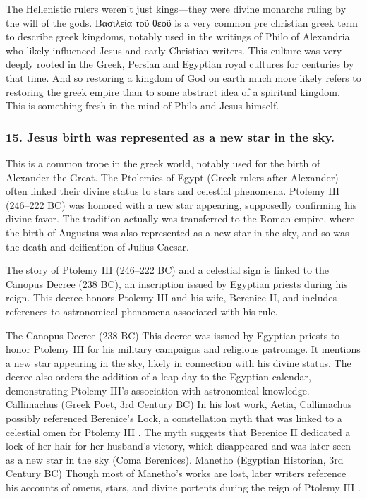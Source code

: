 The Hellenistic rulers weren't just kings---they were divine monarchs ruling by the will of the gods.
Βασιλεία τοῦ θεοῦ is a very common pre christian greek term to describe greek kingdoms, notably used in the writings of Philo of Alexandria who likely influenced Jesus and early Christian writers.
This culture was very deeply rooted in the Greek, Persian and Egyptian royal cultures for centuries by that time.
And so restoring a kingdom of God on earth much more likely refers to restoring the greek empire than to some abstract idea of a spiritual kingdom.
This is something fresh in the mind of Philo and Jesus himself.

\subsubsection{15.
Jesus birth was represented as a new star in the sky.}\label{subsubsec:jesus-birth-was-represented-as-a-new-star-in-the-sky.}

This is a common trope in the greek world, notably used for the birth of Alexander the Great.
The Ptolemies of Egypt (Greek rulers after Alexander) often linked their divine status to stars and celestial phenomena.
Ptolemy III (246--222 BC) was honored with a new star appearing, supposedly confirming his divine favor.
The tradition actually was transferred to the Roman empire, where the birth of Augustus was also represented as a new star in the sky, and so was the death and deification of Julius Caesar.

The story of Ptolemy III (246--222 BC) and a celestial sign is linked to the Canopus Decree (238 BC), an inscription issued by Egyptian priests during his reign.
This decree honors Ptolemy III and his wife, Berenice II, and includes references to astronomical phenomena associated with his rule.

The Canopus Decree (238 BC) This decree was issued by Egyptian priests to honor Ptolemy III for his military campaigns and religious patronage.
It mentions a new star appearing in the sky, likely in connection with his divine status.
The decree also orders the addition of a leap day to the Egyptian calendar, demonstrating Ptolemy III's association with astronomical knowledge.
Callimachus (Greek Poet, 3rd Century BC) In his lost work, Aetia, Callimachus possibly referenced Berenice's Lock, a constellation myth that was linked to a celestial omen for Ptolemy III .
The myth suggests that Berenice II dedicated a lock of her hair for her husband's victory, which disappeared and was later seen as a new star in the sky (Coma Berenices).
Manetho (Egyptian Historian, 3rd Century BC) Though most of Manetho's works are lost, later writers reference his accounts of omens, stars, and divine portents during the reign of Ptolemy III .

